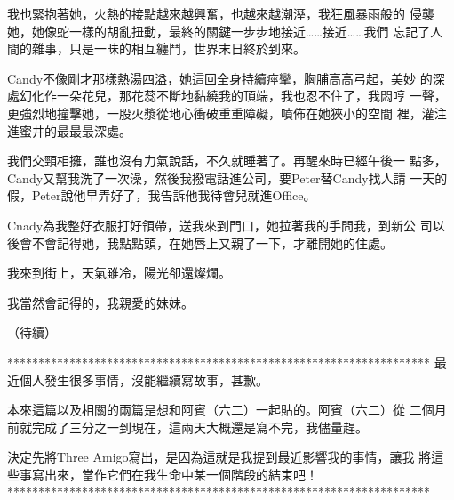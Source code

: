 我也緊抱著她，火熱的接點越來越興奮，也越來越潮溼，我狂風暴雨般的
侵襲她，她像蛇一樣的胡亂扭動，最終的關鍵一步步地接近……接近……我們
忘記了人間的雜事，只是一昧的相互纏鬥，世界末日終於到來。

Candy不像剛才那樣熱湯四溢，她這回全身持續痙攣，胸脯高高弓起，美妙
的深處幻化作一朵花兒，那花蕊不斷地黏繞我的頂端，我也忍不住了，我悶哼
一聲，更強烈地撞擊她，一股火漿從地心衝破重重障礙，噴佈在她狹小的空間
裡，灌注進蜜井的最最最深處。

我們交頸相擁，誰也沒有力氣說話，不久就睡著了。再醒來時已經午後一
點多，Candy又幫我洗了一次澡，然後我撥電話進公司，要Peter替Candy找人請
一天的假，Peter說他早弄好了，我告訴他我待會兒就進Office。

Cnady為我整好衣服打好領帶，送我來到門口，她拉著我的手問我，到新公
司以後會不會記得她，我點點頭，在她唇上又親了一下，才離開她的住處。

我來到街上，天氣雖冷，陽光卻還燦爛。

我當然會記得的，我親愛的妹妹。

（待續）

********************************************************************
最近個人發生很多事情，沒能繼續寫故事，甚歉。

本來這篇以及相關的兩篇是想和阿賓（六二）一起貼的。阿賓（六二）從
二個月前就完成了三分之一到現在，這兩天大概還是寫不完，我儘量趕。

決定先將Three Amigo寫出，是因為這就是我提到最近影響我的事情，讓我
將這些事寫出來，當作它們在我生命中某一個階段的結束吧！
********************************************************************










